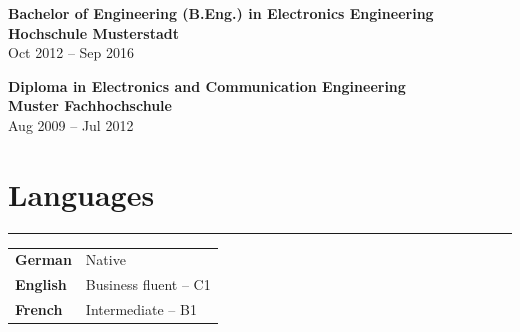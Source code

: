 \documentclass[10pt,a4paper]{article}
\newcommand{\cvsection}[1]{%
  \Needspace{4\baselineskip}%
  \section*{#1}%
  \vspace{-0.32em}%
  {\color{cvgray}\rule{\linewidth}{0.35pt}}%
  \vspace{0.12em}%
}
\newcommand{\cventryheader}[3]{%
  \Needspace{5\baselineskip}%
  {\normalsize\textbf{#1}}\\[-0.10em]
  {\normalsize\textbf{#2}}\\[-0.10em]
  {\small\color{cvgray}#3}\par
  \vspace{0.02em}%
}
\begin{document}
\cventryheader{Bachelor of Engineering (B.Eng.) in Electronics Engineering}{Hochschule Musterstadt}{Oct 2012 -- Sep 2016}

\cventryheader{Diploma in Electronics and Communication Engineering}{Muster Fachhochschule}{Aug 2009 -- Jul 2012}

\cvsection{Languages}

\begin{tabularx}{\textwidth}{@{}L{2.4cm}Y@{}}
  \textbf{German} & Native \\
  \textbf{English} & Business fluent -- C1 \\
  \textbf{French} & Intermediate -- B1 \\
\end{tabularx}
\end{document}
